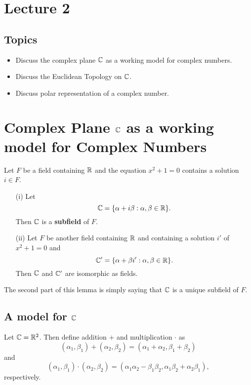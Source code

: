 \documentclass[a4paper]{report}
\begin{document}
\section{Lecture 2}

\subsection{Topics}

\begin{itemize}
    \item Discuss the complex plane \( \mathbb{C}  \) as a working model for complex numbers.
    \item Discuss the Euclidean Topology on \( \mathbb{C}  \).
    \item Discuss polar representation of a complex number.
\end{itemize}

\section{Complex Plane \( \mathbb{C}  \) as a working model for Complex Numbers}
\begin{lemma}
  Let \( F  \) be a field containing \( \mathbb{R}  \) and the equation \( x^{2} + 1  =0 \) contains a solution \( i \in F  \).
\begin{enumerate}
    \item[(i)] Let   
  \[  \mathbb{C} = \{ \alpha + i \beta : \alpha, \beta \in \mathbb{R}  \}. \]
  Then \( \mathbb{C}  \) is a \textbf{subfield} of \( F  \).
    \item[(ii)] Let \( F  \) be another field containing \( \mathbb{R}  \) and containing a solution \( i' \) of \( x^{2} + 1 = 0   \) and
        \[  \mathbb{C}' = \{ \alpha + \beta i' : \alpha, \beta \in \mathbb{R}  \}.  \]
        Then \( \mathbb{C}  \) and \( \mathbb{C}' \) are isomorphic as fields.
\end{enumerate}
\end{lemma}

The second part of this lemma is simply saying that \( \mathbb{C}  \) is a unique subfield of \( F  \).

\subsection{A model for \( \mathbb{C}  \)}

Let \( \mathbb{C} = \mathbb{R}^{2} \). Then define addition \( +  \) and multiplication \( \cdot \) as 
\[  ({\alpha}_{1}, {\beta}_{1}) + ({\alpha}_{2}, {\beta}_{2}) = ({\alpha}_{1} + {\alpha}_{2}, {\beta}_{1} + {\beta}_{2}) \]
and 
\[  ({\alpha}_{1}, {\beta}_{1}) \cdot ({\alpha}_{2}, {\beta}_{2}) = ({\alpha}_{1} {\alpha}_{2} - {\beta}_{1} {\beta}_{2} , {\alpha}_{1} {\beta}_{2} + {\alpha}_{2} {\beta}_{1}), \]
respectively.
\end{document}
